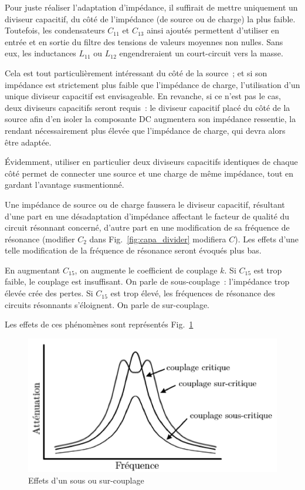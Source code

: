 \documentclass{article}
\begin{document}
Pour juste réaliser l'adaptation d'impédance, il suffirait de mettre uniquement un diviseur capacitif, du côté de l'impédance (de source ou de charge) la plus faible. Toutefois, les condensateurs $C_{11}$ et $C_{13}$ ainsi ajoutés permettent d'utiliser en entrée et en sortie du filtre des tensions de valeurs moyennes non nulles. Sans eux, les inductances $L_{11}$ ou $L_{12}$ engendreraient un court-circuit vers la masse.

Cela est tout particulièrement intéressant du côté de la source~; et si son impédance est strictement plus faible que l'impédance de charge, l'utilisation d'un unique diviseur capacitif est envisageable. En revanche, si ce n'est pas le cas, deux diviseurs capacitifs seront requis~: le diviseur capacitif placé du côté de la source afin d'en isoler la composante DC augmentera son impédance ressentie, la rendant nécessairement plus élevée que l'impédance de charge, qui devra alors être adaptée.

Évidemment, utiliser en particulier deux diviseurs capacitifs identiques de chaque côté permet de connecter une source et une charge de même impédance, tout en gardant l'avantage susmentionné.



Une impédance de source ou de charge faussera le diviseur capacitif, résultant d'une part en une désadaptation d'impédance affectant le facteur de qualité du circuit résonnant concerné, d'autre part en une modification de sa fréquence de résonance (modifier $C_2$ dans Fig.~\ref{fig:capa_divider} modifiera $C$). Les effets d'une telle modification de la fréquence de résonance seront évoqués plus bas.



En augmentant $C_{15}$, on augmente le coefficient de couplage $k$. Si $C_{15}$ est trop faible, le couplage est insuffisant. On parle de sous-couplage~: l'impédance trop élevée crée des pertes. Si $C_{15}$ est trop élevé, les fréquences de résonance des circuits résonnants s'éloignent. On parle de sur-couplage.

Les effets de ces phénomènes sont représentés Fig.~\ref{fig:coupling_effect}

\begin{figure}[h!]
	\centering
	\includegraphics[width=.4\textwidth]{coupling_effect}
	\caption{Effets d'un sous ou sur-couplage}
	\label{fig:coupling_effect}
\end{figure}
\end{document}
